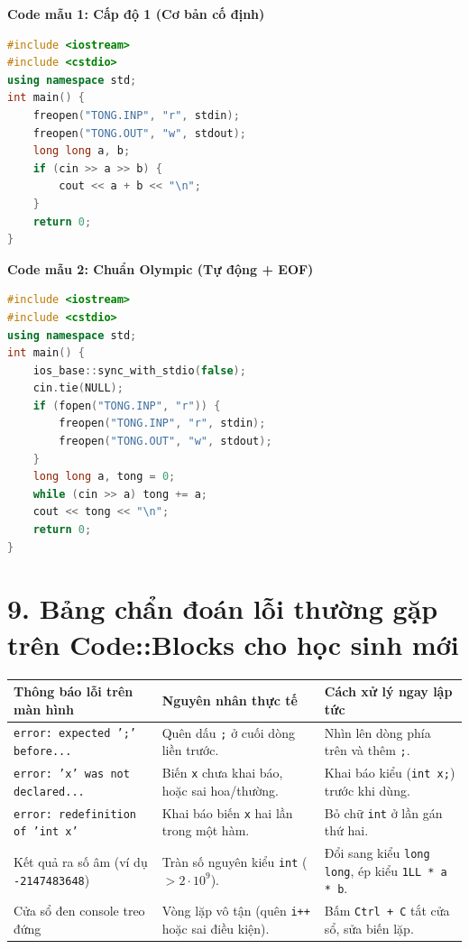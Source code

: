 \documentclass[11pt,a4paper]{article}
\begin{document}
\vspace{-1mm}
\noindent
\begin{minipage}[t]{0.48\textwidth}
\textbf{\color{AsianDarkBlue}\footnotesize Code mẫu 1: Cấp độ 1 (Cơ bản cố định)}
\begin{lstlisting}[language=C++,basicstyle=\ttfamily\scriptsize,numbers=none,aboveskip=1mm,belowskip=1mm]
#include <iostream>
#include <cstdio>
using namespace std;
int main() {
    freopen("TONG.INP", "r", stdin);
    freopen("TONG.OUT", "w", stdout);
    long long a, b;
    if (cin >> a >> b) {
        cout << a + b << "\n";
    }
    return 0;
}
\end{lstlisting}
\end{minipage}
\hfill
\begin{minipage}[t]{0.49\textwidth}
\textbf{\color{AsianDarkBlue}\footnotesize Code mẫu 2: Chuẩn Olympic (Tự động + EOF)}
\begin{lstlisting}[language=C++,basicstyle=\ttfamily\scriptsize,numbers=none,aboveskip=1mm,belowskip=1mm]
#include <iostream>
#include <cstdio>
using namespace std;
int main() {
    ios_base::sync_with_stdio(false);
    cin.tie(NULL);
    if (fopen("TONG.INP", "r")) {
        freopen("TONG.INP", "r", stdin);
        freopen("TONG.OUT", "w", stdout);
    }
    long long a, tong = 0;
    while (cin >> a) tong += a;
    cout << tong << "\n";
    return 0;
}
\end{lstlisting}
\end{minipage}

\vspace{-2mm}
\section*{\color{AsianDarkBlue}\normalsize 9. Bảng chẩn đoán lỗi thường gặp trên Code::Blocks cho học sinh mới}
\begin{center}
\footnotesize
\begin{tabular}{@{}p{4.2cm}p{4.5cm}p{7.3cm}@{}}
\toprule
\textbf{Thông báo lỗi trên màn hình} & \textbf{Nguyên nhân thực tế} & \textbf{Cách xử lý ngay lập tức} \\
\midrule
\texttt{error: expected ';' before...} & Quên dấu \texttt{;} ở cuối dòng liền trước. & Nhìn lên dòng phía trên và thêm \texttt{;}. \\
\addlinespace[2pt]
\texttt{error: 'x' was not declared...} & Biến \texttt{x} chưa khai báo, hoặc sai hoa/thường. & Khai báo kiểu (\texttt{int x;}) trước khi dùng. \\
\addlinespace[2pt]
\texttt{error: redefinition of 'int x'} & Khai báo biến \texttt{x} hai lần trong một hàm. & Bỏ chữ \texttt{int} ở lần gán thứ hai. \\
\addlinespace[2pt]
Kết quả ra số âm (ví dụ \texttt{-2147483648}) & Tràn số nguyên kiểu \texttt{int} ($> 2 \cdot 10^9$). & Đổi sang kiểu \texttt{long long}, ép kiểu \texttt{1LL * a * b}. \\
\addlinespace[2pt]
Cửa sổ đen console treo đứng & Vòng lặp vô tận (quên \texttt{i++} hoặc sai điều kiện). & Bấm \texttt{Ctrl + C} tắt cửa sổ, sửa biến lặp. \\
\bottomrule
\end{tabular}
\end{center}
\end{document}
